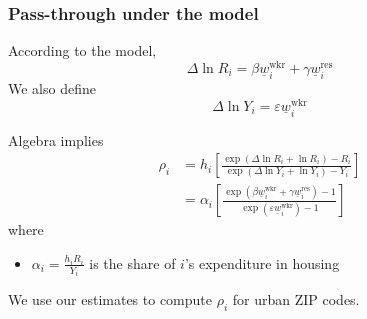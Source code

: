 \documentclass[aspectratio=169, t]{beamer}
\newcommand{\MW}{\underline{w}}
\begin{document}
\begin{frame}
    \frametitle{Pass-through under the model}

    According to the model,
    $$
    \Delta \ln R_i = \beta \MW_i^{\text{wkr}} + \gamma \MW_i^{\text{res}}
    $$
    We also define
    $$
    \Delta \ln Y_i = \varepsilon \MW_i^{\text{wkr}}
    $$

    \pause
    \vspace{2mm}
    Algebra implies
    \begin{equation*}
        \begin{split}
            \rho_i & = h_i \left[ 
                \frac{\exp \left(\Delta \ln R_i + \ln R_i \right) - R_i }{\exp \left( \Delta \ln Y_i + \ln Y_i \right) - Y_i }
                \right] \\
                & = \alpha_i \left[
                    \frac{\exp \left( \beta \MW_i^{\text{wkr}} + \gamma \MW_i^{\text{res}} \right) - 1 }{\exp \left( \varepsilon \MW_i^{\text{wkr}} \right) - 1 }
                \right]
        \end{split}
    \end{equation*}
    where
    \begin{itemize}
        \item $\alpha_i = \frac{h_i R_i}{Y_i}$ is the share of $i$'s expenditure in housing
    \end{itemize}

    \vspace{2mm}
    We use our estimates to compute $\rho_i$ for urban ZIP codes.
\end{frame}
\end{document}

